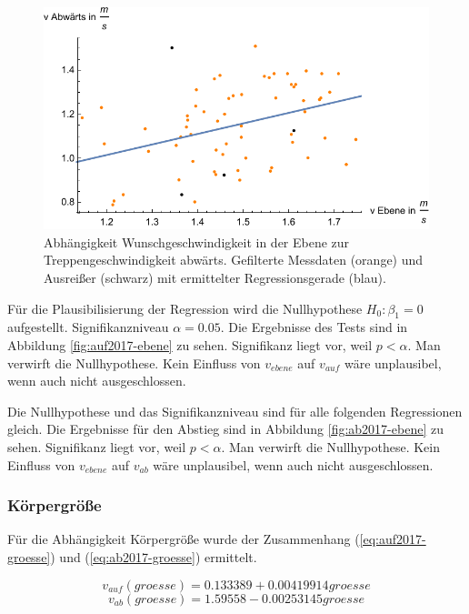 \begin{figure} \centering 
	\includegraphics[]{abbildungen/regression/2017/ohneausreisser/ab-ebene.pdf}
	
	\caption{Abhängigkeit Wunschgeschwindigkeit in der Ebene zur Treppengeschwindigkeit abwärts. Gefilterte Messdaten (orange) und Ausreißer (schwarz) mit ermittelter Regressionsgerade (blau).
	\label{fig:ohne-ab2017-ebene}}
\end{figure}

Für die Plausibilisierung der Regression wird die Nullhypothese 
$H_0: \beta_1 = 0$ aufgestellt. Signifikanzniveau $\alpha = 0.05$.
Die Ergebnisse des Tests sind in Abbildung \ref{fig:auf2017-ebene} zu sehen.
Signifikanz liegt vor, weil $p < \alpha$. Man verwirft die
Nullhypothese. Kein Einfluss von $v_{ebene}$ auf $v_{auf}$ wäre unplausibel, wenn auch nicht ausgeschlossen.

Die Nullhypothese und das Signifikanzniveau sind für alle folgenden Regressionen gleich. Die Ergebnisse für den Abstieg sind in Abbildung \ref{fig:ab2017-ebene} zu sehen.
Signifikanz liegt vor, weil $p < \alpha$. Man verwirft die
Nullhypothese. Kein Einfluss von $v_{ebene}$ auf $v_{ab}$ wäre unplausibel, wenn auch nicht ausgeschlossen.

\subsubsection{Körpergröße}

Für die Abhängigkeit Körpergröße wurde 
der Zusammenhang (\ref{eq:auf2017-groesse}) und (\ref{eq:ab2017-groesse}) ermittelt.

\begin{equation} \label{eq:auf2017-groesse}
	v_{auf}(groesse) = 0.133389 + 0.00419914 groesse
\end{equation}
\begin{equation} \label{eq:ab2017-groesse}
	v_{ab}(groesse) = 1.59558 - 0.00253145 groesse
\end{equation}

